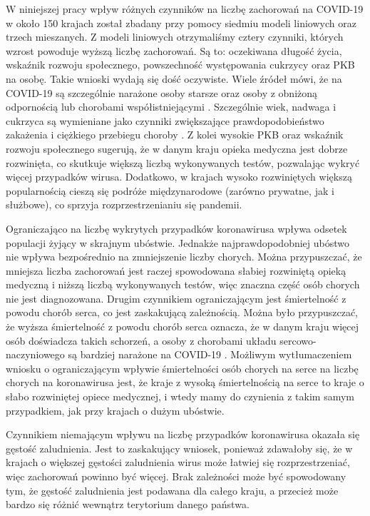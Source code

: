 \documentclass[12pt]{mwbk}
\theoremstyle{plain}
\theoremstyle{definition}
\theoremstyle{remark}
\begin{document}
W niniejszej pracy wpływ różnych czynników na liczbę zachorowań na COVID-19 w około 150 krajach został zbadany przy pomocy siedmiu modeli liniowych oraz trzech mieszanych. Z modeli liniowych otrzymaliśmy cztery czynniki, których wzrost powoduje wyższą liczbę zachorowań. Są to: oczekiwana długość życia, wskaźnik rozwoju społecznego, powszechność występowania cukrzycy oraz PKB na osobę. Takie wnioski wydają się dość oczywiste. Wiele źródeł mówi, że na COVID-19 są szczególnie narażone osoby starsze oraz osoby z obniżoną odpornością lub chorobami współistniejącymi \cite{narazenie}. Szczególnie wiek, nadwaga i cukrzyca są wymieniane jako czynniki zwiększające prawdopodobieństwo zakażenia i ciężkiego przebiegu choroby \cite{covid-19}. Z kolei wysokie PKB oraz wskaźnik rozwoju społecznego sugerują, że w danym kraju opieka medyczna jest dobrze rozwinięta, co skutkuje większą liczbą wykonywanych testów, pozwalając wykryć więcej przypadków wirusa. Dodatkowo, w krajach wysoko rozwiniętych większą popularnością cieszą się podróże międzynarodowe (zarówno prywatne, jak i służbowe), co sprzyja rozprzestrzenianiu się pandemii.

Ograniczająco na liczbę wykrytych przypadków koronawirusa wpływa odsetek populacji żyjący w skrajnym ubóstwie. Jednakże najprawdopodobniej ubóstwo nie wpływa bezpośrednio na zmniejszenie liczby chorych. Można przypuszczać, że mniejsza liczba zachorowań jest raczej spowodowana słabiej rozwiniętą opieką medyczną i niższą liczbą wykonywanych testów, więc znaczna część osób chorych nie jest diagnozowana. Drugim czynnikiem ograniczającym jest śmiertelność z powodu chorób serca, co jest zaskakującą zależnością. Można było przypuszczać, że wyższa śmiertelność z powodu chorób serca oznacza, że w danym kraju więcej osób doświadcza takich schorzeń, a osoby z chorobami układu sercowo-naczyniowego są bardziej narażone na COVID-19 \cite{narazenie} \cite{covid-19}. Możliwym wytłumaczeniem wniosku o ograniczającym wpływie śmiertelności osób chorych na serce na liczbę chorych na koronawirusa jest, że kraje z wysoką śmiertelnością na serce to kraje o słabo rozwiniętej opiece medycznej, i wtedy mamy do czynienia z takim samym przypadkiem, jak przy krajach o dużym ubóstwie.

Czynnikiem niemającym wpływu na liczbę przypadków koronawirusa okazała się gęstość zaludnienia. Jest to zaskakujący wniosek, ponieważ zdawałoby się, że w krajach o większej gęstości zaludnienia wirus może łatwiej się rozprzestrzeniać, więc zachorowań powinno być więcej. Brak zależności może być spowodowany tym, że gęstość zaludnienia jest podawana dla całego kraju, a przecież może bardzo się różnić wewnątrz terytorium danego państwa.
\end{document}

